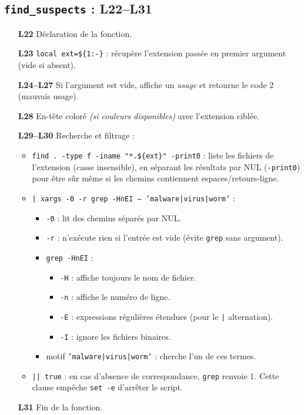 \documentclass[11pt,a4paper]{article}
\begin{document}
\subsection*{\texttt{find\_suspects} : L22--L31}
\begin{enumerate}
  \item[\textbf{L22}] Déclaration de la fonction.
  \item[\textbf{L23}] \texttt{local ext=\$\{1:-\}} : récupère l'extension passée en premier argument (vide si absent).
  \item[\textbf{L24--L27}] Si l'argument est vide, affiche un \emph{usage} et retourne le code 2 (mauvais usage).
  \item[\textbf{L28}] En-tête coloré \emph{(si couleurs disponibles)} avec l'extension ciblée.
  \item[\textbf{L29--L30}] Recherche et filtrage :
  \begin{itemize}
    \item \texttt{find . -type f -iname "*.\$\{ext\}" -print0} : liste les fichiers de l'extension (casse insensible), en séparant les résultats par NUL (\texttt{-print0}) pour être sûr même si les chemins contiennent espaces/retours-ligne.
    \item \texttt{| xargs -0 -r grep -HnEI -- 'malware|virus|worm'} :
      \begin{itemize}
        \item \texttt{-0} : lit des chemins séparés par NUL.
        \item \texttt{-r} : n'exécute rien si l'entrée est vide (évite \texttt{grep} sans argument).
        \item \texttt{grep -HnEI} :
          \begin{itemize}
            \item \texttt{-H} : affiche toujours le nom de fichier.
            \item \texttt{-n} : affiche le numéro de ligne.
            \item \texttt{-E} : expressions régulières étendues (pour le \texttt{|} alternation).
            \item \texttt{-I} : ignore les fichiers binaires.
          \end{itemize}
        \item motif \texttt{'malware|virus|worm'} : cherche l'un de ces termes.
      \end{itemize}
    \item \texttt{|| true} : en cas d'absence de correspondance, \texttt{grep} renvoie 1. Cette clause empêche \texttt{set -e} d'arrêter le script.
  \end{itemize}
  \item[\textbf{L31}] Fin de la fonction.
\end{enumerate}
\end{document}
